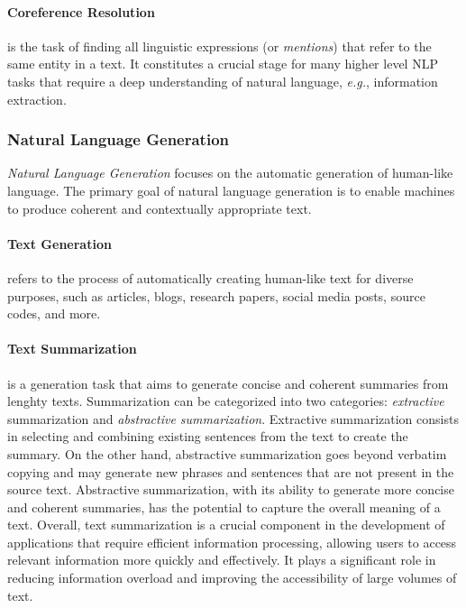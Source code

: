 \paragraph{Coreference Resolution} is the task of finding all linguistic expressions (or \textit {mentions}) that refer to the same entity in a text. It constitutes a crucial stage for many higher level \ac{NLP} tasks that require a deep understanding of natural language, \textit{e.g.}, information extraction.

\subsubsection{Natural Language Generation} 

\textit{Natural Language Generation} focuses on the automatic generation of human-like language. The primary goal of natural language generation is to enable machines to produce coherent and contextually appropriate text.

\paragraph{Text Generation} refers to the process of automatically creating human-like text for diverse purposes, such as articles, blogs, research papers, social media posts, source codes, and more.

\paragraph{Text Summarization} is a generation task that aims to generate concise and coherent summaries from lenghty texts. Summarization can be categorized into two categories: \textit{extractive} summarization and \textit{abstractive summarization}. Extractive summarization consists in selecting and combining existing sentences from the text to create the summary. On the other hand, abstractive summarization goes beyond verbatim copying and may generate new phrases and sentences that are not present in the source text. Abstractive summarization, with its ability to generate more concise and coherent summaries, has the potential to capture the overall meaning of a text. Overall, text summarization is a crucial component in the development of applications that require efficient information processing, allowing users to access relevant information more quickly and effectively. It plays a significant role in reducing information overload and improving the accessibility of large volumes of text.

